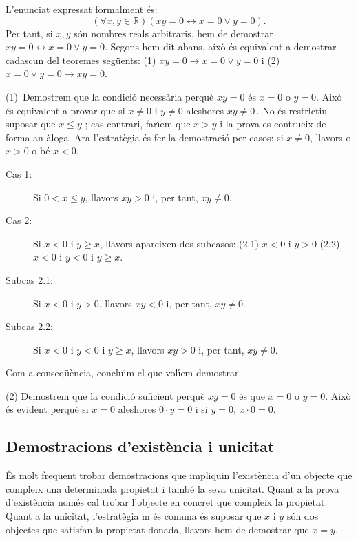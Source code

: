 \begin{solucio}
L'enunciat expressat formalment \'{e}s:%
\begin{equation*}
\left( \forall x,y\in\mathbb{R}\right) \left( xy=0\longleftrightarrow
x=0\vee y=0\right) \text{.}
\end{equation*}
Per tant, si $x,y$ s\'{o}n nombres reals arbitraris, hem de demostrar $%
xy=0\longleftrightarrow x=0\vee y=0$. Segons hem dit abans, aix\`{o} \'{e}s
equivalent a demostrar cadascun del teoremes seg\"{u}ents: (1) $%
xy=0\longrightarrow x=0\vee y=0$ i (2) $x=0\vee y=0\longrightarrow xy=0$.

(1)\ Demostrem que la condici\'{o} necess\`{a}ria perqu\`{e} \thinspace$xy=0
$ \'{e}s $x=0$ o $y=0$. Aix\`{o} \'{e}s equivalent a provar que si $x\neq0$
i $y\neq0$ aleshores $xy\neq0\,$. No \'{e}s restrictiu suposar que $x\leq y $%
; cas contrari, far\'{\i}em que $x>y$ i la prova es contrueix de forma an%
\`{a}loga. Ara l'estrat\`{e}gia \'{e}s fer la demostraci\'{o} per casos: si $%
x\neq0$, llavors o $x>0$ o b\'{e} $x<0$.

\begin{description}
\item[Cas 1:] Si $0<x\leq y$, llavors $xy>0$ i, per tant, $xy\neq0$.

\item[Cas 2:] Si $x<0$ i $y\geq x$, llavors apareixen dos subcasos: (2.1) $%
x<0$ i $y>0$ (2.2) $x<0$ i $y<0$ i $y\geq x$.

\item[Subcas 2.1:] Si $x<0$ i $y>0$, llavors $xy<0$ i, per tant, $xy\neq0$.

\item[Subcas 2.2:] Si $x<0$ i $y<0$ i $y\geq x$, llavors $xy>0$ i, per tant,
$xy\neq0$.
\end{description}

Com a conseq\"{u}\`{e}ncia, conclu\"{\i}m el que vol\'{\i}em demostrar.

(2) Demostrem que la condici\'{o} suficient perqu\`{e} $xy=0$ \'{e}s que $%
x=0 $ o $y=0$. Aix\`{o} \'{e}s evident perqu\`{e} si $x=0$ aleshores $0\cdot
y=0$ i si $y=0$, $x\cdot0=0$.
\end{solucio}

\subsection{Demostracions d'exist\`{e}ncia i unicitat}

\'{E}s molt freq\"{u}ent trobar demostracions que impliquin l'exist\`{e}ncia
d'un objecte que compleix una determinada propietat i tamb\'{e} la seva
unicitat. Quant a la prova d'exist\`{e}ncia nom\'{e}s cal trobar l'objecte
en concret que compleix la propietat. Quant a la unicitat, l'estrat\`{e}gia m%
\'{e}s comuna \'{e}s suposar que $x$ i $y$ s\'{o}n dos objectes que satisfan
la propietat donada, llavors hem de demostrar que $x=y$.

